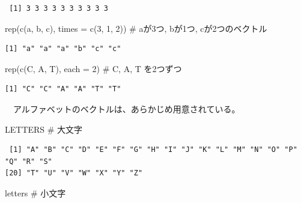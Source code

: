 \documentclass[
  a4paper,
  pandoc,
  ja=standard,
  jafont=haranoaji]{bxjsbook}
\newenvironment{Shaded}{\begin{snugshade}}{\end{snugshade}}
\newcommand{\AttributeTok}[1]{\textcolor[rgb]{0.00,0.48,0.65}{#1}}
\newcommand{\CommentTok}[1]{\textcolor[rgb]{0.37,0.37,0.37}{#1}}
\newcommand{\DecValTok}[1]{\textcolor[rgb]{0.68,0.00,0.00}{#1}}
\newcommand{\FunctionTok}[1]{\textcolor[rgb]{0.28,0.35,0.67}{#1}}
\newcommand{\NormalTok}[1]{\textcolor[rgb]{0.00,0.48,0.65}{#1}}
\newcommand{\StringTok}[1]{\textcolor[rgb]{0.13,0.47,0.30}{#1}}
\begin{document}
\begin{verbatim}
 [1] 3 3 3 3 3 3 3 3 3 3
\end{verbatim}

\begin{Shaded}
\begin{Highlighting}[numbers=left,,]
\FunctionTok{rep}\NormalTok{(}\FunctionTok{c}\NormalTok{(}\StringTok{\textquotesingle{}a\textquotesingle{}}\NormalTok{, }\StringTok{\textquotesingle{}b\textquotesingle{}}\NormalTok{, }\StringTok{\textquotesingle{}c\textquotesingle{}}\NormalTok{), }\AttributeTok{times =} \FunctionTok{c}\NormalTok{(}\DecValTok{3}\NormalTok{, }\DecValTok{1}\NormalTok{, }\DecValTok{2}\NormalTok{))  }\CommentTok{\# aが3つ, bが1つ, cが2つのベクトル}
\end{Highlighting}
\end{Shaded}

\begin{verbatim}
[1] "a" "a" "a" "b" "c" "c"
\end{verbatim}

\begin{Shaded}
\begin{Highlighting}[numbers=left,,]
\FunctionTok{rep}\NormalTok{(}\FunctionTok{c}\NormalTok{(}\StringTok{\textquotesingle{}C\textquotesingle{}}\NormalTok{, }\StringTok{\textquotesingle{}A\textquotesingle{}}\NormalTok{, }\StringTok{\textquotesingle{}T\textquotesingle{}}\NormalTok{), }\AttributeTok{each =} \DecValTok{2}\NormalTok{)            }\CommentTok{\# C, A, T を2つずつ}
\end{Highlighting}
\end{Shaded}

\begin{verbatim}
[1] "C" "C" "A" "A" "T" "T"
\end{verbatim}

　アルファベットのベクトルは、あらかじめ用意されている。

\begin{Shaded}
\begin{Highlighting}[numbers=left,,]
\NormalTok{LETTERS  }\CommentTok{\# 大文字}
\end{Highlighting}
\end{Shaded}

\begin{verbatim}
 [1] "A" "B" "C" "D" "E" "F" "G" "H" "I" "J" "K" "L" "M" "N" "O" "P" "Q" "R" "S"
[20] "T" "U" "V" "W" "X" "Y" "Z"
\end{verbatim}

\begin{Shaded}
\begin{Highlighting}[numbers=left,,]
\NormalTok{letters  }\CommentTok{\# 小文字}
\end{Highlighting}
\end{Shaded}
\end{document}
